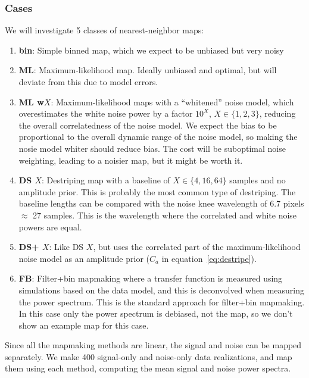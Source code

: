 \documentclass[twocolumn,apj]{aastex63}
\newcommand{\dfn}[1]{\textbf{#1}}
\begin{document}
\subsubsection{Cases}
\label{sec:2d-cases}
We will investigate 5 classes of nearest-neighbor maps:
\begin{enumerate}
	\item \dfn{bin}: Simple binned map, which we expect to be unbiased but very noisy
	\item \dfn{ML}: Maximum-likelihood map. Ideally unbiased and optimal, but will deviate
		from this due to model errors.
	\item \dfn{ML w$X$}: Maximum-likelihood maps with a ``whitened'' noise model,
		which overestimates the
		white noise power by a factor $10^X$, $X\in\{1,2,3\}$, reducing the overall
		correlatedness of the noise model. We expect the bias to be proportional to the
		overall dynamic range of the noise model,
		so making the nosie model whiter should reduce bias. The cost will be suboptimal noise
		weighting, leading to a noisier map, but it might be worth it.
	\item \dfn{DS $X$}: Destriping map with a baseline of $X\in \{4,16,64\}$ samples and no amplitude
		prior. This is probably the most common type of destriping. The baseline lengths
		can be compared with the noise knee wavelength of 6.7 pixels $\approx$ 27 samples.
		This is the wavelength where the correlated and white noise powers are equal.
	\item \dfn{DS+ $X$}: Like DS $X$, but uses the correlated part of the maximum-likelihood
		noise model as an amplitude prior ($C_a$ in equation~\ref{eq:destripe}).
	\item \dfn{FB}: Filter+bin mapmaking where a transfer function is measured using
		simulations based on the data model, and this is deconvolved when measuring
		the power spectrum. This is the standard approach for filter+bin mapmaking.
		In this case only the power spectrum is debiased, not the map, so we don't
		show an example map for this case.
\end{enumerate}

Since all the mapmaking methods are linear, the signal and noise can be mapped separately.
We make 400 signal-only and noise-only data realizations, and map them using each method,
computing the mean signal and noise power spectra.
\end{document}
